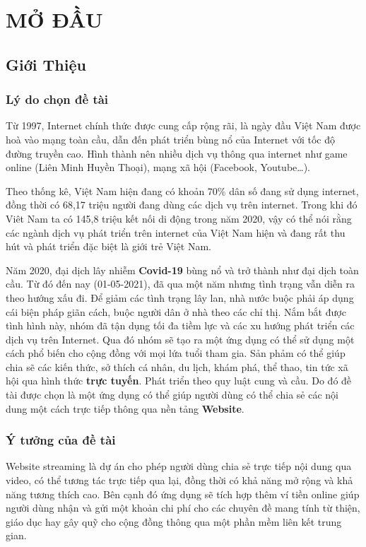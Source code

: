 \chapter{MỞ ĐẦU}
\section{Giới Thiệu}
\subsection{Lý do chọn đề tài}
Từ 1997, Internet chính thức được cung cấp rộng rãi, là ngày đầu Việt Nam được hoà vào mạng toàn cầu, dẫn đến phát triển bùng nổ của Internet với tốc độ đường truyền cao. Hình thành nên nhiều dịch vụ thông qua internet như game online (Liên Minh Huyền Thoại), mạng xã hội (Facebook, Youtube…).
\par Theo thống kê, Việt Nam hiện đang có khoản 70\% dân số đang sử dụng internet, đồng thời có 68,17 triệu người đang dùng các dịch vụ trên internet. Trong khi đó Viêt Nam ta có 145,8 triệu kết nối di động trong năm 2020, vậy có thể nói rằng các ngành dịch vụ phát triển trên internet của Việt Nam hiện và đang rất thu hút và phát triển đặc biệt là giới trẻ Việt Nam.
\par Năm 2020, đại dịch lây nhiễm \textbf{Covid-19} bùng nổ và trở thành như đại dịch toàn cầu. Từ đó đến nay (01-05-2021), đã qua một năm nhưng tình trạng vẫn diễn ra theo hướng xấu đi. Để giảm các tình trạng lây lan, nhà nước buộc phải áp dụng cái biện pháp giãn cách, buộc người dân ở nhà theo các chỉ thị. Nắm bắt được tình hình này, nhóm đã tận dụng tối đa tiềm lực và các xu hướng phát triển các dịch vụ trên Internet. Qua đó nhóm sẽ tạo ra một ứng dụng có thể sử dụng một cách phổ biến cho cộng đồng với mọi lứa tuổi tham gia. Sản phảm có thể giúp chia sẽ các kiến thức, sở thích cá nhân, du lịch, khám phá, thể thao, tin tức xã hội qua hình thức \textbf{trực tuyến}. Phát triển theo quy luật cung và cầu. Do đó đề tài được chọn là một ứng dụng có thể giúp người dùng có thể chia sẻ các nội dung một cách trực tiếp thông qua nền tảng \textbf{Website}. 

\subsection{Ý tưởng của đề tài}
Website streaming là dự án cho phép người dùng chia sẻ trực tiếp nội dung qua video, có thể tương tác trực tiếp qua lại, đồng thời có khả năng mở rộng và khả năng tương thích cao. Bên cạnh đó ứng dụng sẽ tích hợp thêm ví tiền online giúp người dùng nhận và gửi một khoản chi phí cho các chuyên đề mang tính từ thiện, giáo dục hay gây quỹ cho cộng đồng thông qua một phần mềm liên kết trung gian.
